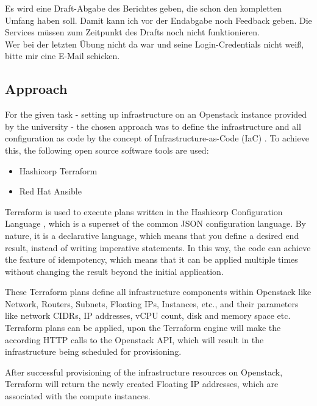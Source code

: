 \noindent
Es wird eine Draft-Abgabe des Berichtes geben, die schon den kompletten Umfang
haben soll. Damit kann ich vor der Endabgabe noch Feedback geben. Die Services
müssen zum Zeitpunkt des Drafts noch nicht funktionieren. \\

\noindent
Wer bei der letzten Übung nicht da war und seine Login-Credentials nicht
weiß, bitte mir eine E-Mail schicken. \\

\subsection{Approach}

For the given task - setting up infrastructure on 
an Openstack \cite{openstackWebsite} instance provided by the university -
the chosen approach was to define the infrastructure and all configuration
as code by the concept of Infrastructure-as-Code (IaC) \cite{iacDefinitionIBM}.
To achieve this, the following open source software tools are used:

\begin{itemize}
	\item Hashicorp Terraform \cite{terraformWebsite}
	\item Red Hat Ansible \cite{ansibleWebsite}
\end{itemize}

\noindent
Terraform is used to execute plans written in the 
Hashicorp Configuration Language \cite{hclWebsite},
which is a superset of the common JSON configuration language.
By nature, it is a declarative language, which means that
you define a desired end result, instead of writing imperative statements.
In this way, the code can achieve the feature of idempotency,
which means that it can be applied multiple times without 
changing the result beyond the initial application.

These Terraform plans define all infrastructure components
within Openstack like Network, Routers, Subnets, Floating IPs, Instances, etc.,
and their parameters like network CIDRs, IP addresses, vCPU count, disk and memory space etc.
Terraform plans can be applied, upon the Terraform engine will make
the according HTTP calls to the Openstack API, which will result in the infrastructure
being scheduled for provisioning.

After successful provisioning of the infrastructure resources on Openstack,
Terraform will return the newly created Floating IP addresses, 
which are associated with the compute instances. 

